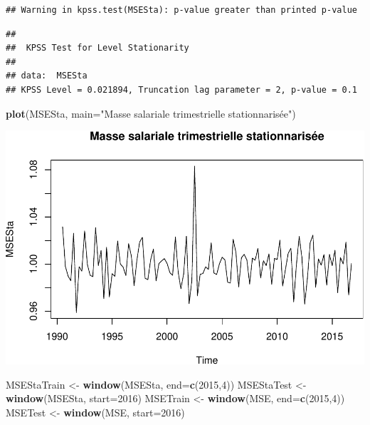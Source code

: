 \documentclass[11pt,]{article}
\newenvironment{Shaded}{\begin{snugshade}}{\end{snugshade}}
\newcommand{\KeywordTok}[1]{\textcolor[rgb]{0.13,0.29,0.53}{\textbf{{#1}}}}
\newcommand{\DataTypeTok}[1]{\textcolor[rgb]{0.13,0.29,0.53}{{#1}}}
\newcommand{\DecValTok}[1]{\textcolor[rgb]{0.00,0.00,0.81}{{#1}}}
\newcommand{\StringTok}[1]{\textcolor[rgb]{0.31,0.60,0.02}{{#1}}}
\newcommand{\NormalTok}[1]{{#1}}
\begin{document}
\begin{verbatim}
## Warning in kpss.test(MSESta): p-value greater than printed p-value
\end{verbatim}

\begin{verbatim}
## 
##  KPSS Test for Level Stationarity
## 
## data:  MSESta
## KPSS Level = 0.021894, Truncation lag parameter = 2, p-value = 0.1
\end{verbatim}

\begin{Shaded}
\begin{Highlighting}[]
  \KeywordTok{plot}\NormalTok{(MSESta, }\DataTypeTok{main=}\StringTok{"Masse salariale trimestrielle stationnarisée"}\NormalTok{)}
\end{Highlighting}
\end{Shaded}

\includegraphics{doc_files/figure-latex/unnamed-chunk-6-3.pdf}

\begin{Shaded}
\begin{Highlighting}[]
  \NormalTok{MSEStaTrain <-}\StringTok{ }\KeywordTok{window}\NormalTok{(MSESta, }\DataTypeTok{end=}\KeywordTok{c}\NormalTok{(}\DecValTok{2015}\NormalTok{,}\DecValTok{4}\NormalTok{))}
  \NormalTok{MSEStaTest <-}\StringTok{ }\KeywordTok{window}\NormalTok{(MSESta, }\DataTypeTok{start=}\DecValTok{2016}\NormalTok{)}
  \NormalTok{MSETrain <-}\StringTok{ }\KeywordTok{window}\NormalTok{(MSE, }\DataTypeTok{end=}\KeywordTok{c}\NormalTok{(}\DecValTok{2015}\NormalTok{,}\DecValTok{4}\NormalTok{))}
  \NormalTok{MSETest <-}\StringTok{ }\KeywordTok{window}\NormalTok{(MSE, }\DataTypeTok{start=}\DecValTok{2016}\NormalTok{)}
\end{Highlighting}
\end{Shaded}
\end{document}
